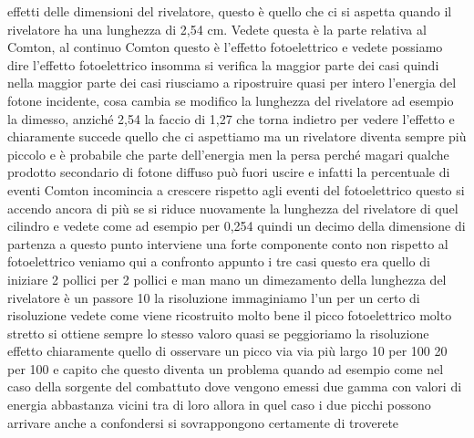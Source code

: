effetti delle dimensioni del rivelatore, questo è quello che ci si aspetta quando il rivelatore ha una lunghezza di 2,54 cm. Vedete questa è la parte relativa al Comton, al continuo Comton questo è l'effetto fotoelettrico e vedete possiamo dire l'effetto fotoelettrico insomma si verifica la maggior parte dei casi quindi nella maggior parte dei casi riusciamo a ripostruire quasi per intero l'energia del fotone incidente, cosa cambia se modifico la lunghezza del rivelatore ad esempio la dimesso, anziché 2,54 la faccio di 1,27 che torna indietro per vedere l'effetto e chiaramente succede quello che ci aspettiamo ma un rivelatore diventa sempre più piccolo e è probabile che parte dell'energia men la persa perché magari qualche prodotto secondario di fotone diffuso può fuori uscire e infatti la percentuale di eventi Comton incomincia a crescere rispetto agli eventi del fotoelettrico questo si accendo ancora di più se si riduce nuovamente la lunghezza del rivelatore di quel cilindro e vedete come ad esempio per 0,254 quindi un decimo della dimensione di partenza a questo punto interviene una forte componente conto non rispetto al fotoelettrico veniamo qui a confronto appunto i tre casi questo era quello di iniziare 2 pollici per 2 pollici e man mano un dimezamento della lunghezza del rivelatore è un passore 10 la risoluzione immaginiamo l'un per un certo di risoluzione vedete come viene ricostruito molto bene il picco fotoelettrico molto stretto si ottiene sempre lo stesso valoro quasi se peggioriamo la risoluzione effetto chiaramente quello di osservare un picco via via più largo 10 per 100 20 per 100 e capito che questo diventa un problema quando ad esempio come nel caso della sorgente del combattuto dove vengono emessi due gamma con valori di energia abbastanza vicini tra di loro allora in quel caso i due picchi possono arrivare anche a confondersi si sovrappongono certamente di troverete 

